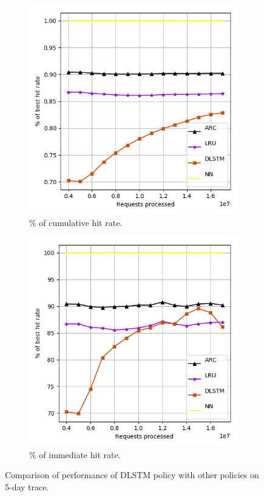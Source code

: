 \begin{figure}[b!]
	\begin{subfigure}[b]{0.49\linewidth}
		\includegraphics[width=\linewidth]{pics/dlstm_cum.png}
		\caption{\% of cumulative hit rate.}
	\end{subfigure}
	\begin{subfigure}[b]{0.49\linewidth}
		\includegraphics[width=\linewidth]{pics/dlstm_i.png}
		\caption{\% of immediate hit rate.}
	\end{subfigure}

	\caption{Comparison of performance of DLSTM policy with other policies on 5-day trace.}
	\label{fig:dlstm}
\end{figure}

